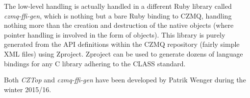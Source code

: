 The low-level handling is actually handled in a different Ruby library called
\emph{czmq-ffi-gen}, which is nothing but a bare Ruby binding to CZMQ, handling
nothing more than the creation and destruction of the native objects (where
pointer handling is involved in the form of  objects). This
library is purely generated from the API definitions within the CZMQ repository
(fairly simple XML files) using Zproject. Zproject can be used to generate
dozens of language bindings for any C library adhering to the \gls{CLASS}
standard.

Both \emph{CZTop} and \emph{czmq-ffi-gen} have been developed by Patrik Wenger
during the winter 2015/16.

